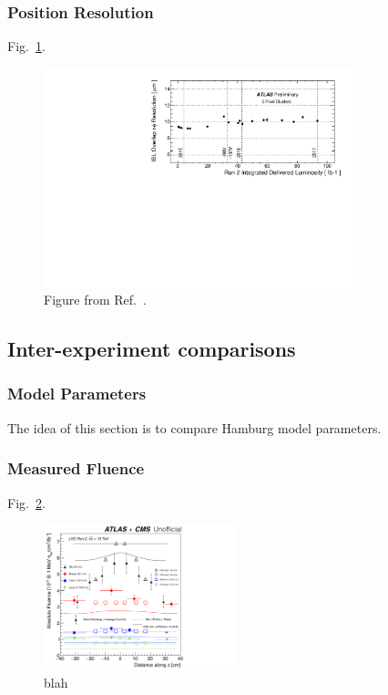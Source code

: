 \subsubsection{Position Resolution}

Fig.~\ref{lab:sensormeasurements:positionresolution:ATLAS}.

\begin{figure}[h!]
\centering
\includegraphics[width=0.8\textwidth]{figures/SensorMeasurements/PositionResolution/fig_01.pdf}
\caption{Figure from Ref.~\cite{ATL-PIX-2018-002}.}
\label{lab:sensormeasurements:positionresolution:ATLAS}
\end{figure}

\subsection{Inter-experiment comparisons}

\subsubsection{Model Parameters}

The idea of this section is to compare Hamburg model parameters.

\subsubsection{Measured Fluence}

Fig.~\ref{lab:sensormeasurements:blah}.

\begin{figure}[h!]
\centering
\includegraphics[width=0.5\textwidth]{figures/SensorMeasurements/CombinationPlot}
\caption{blah}
\label{lab:sensormeasurements:blah}
\end{figure}

